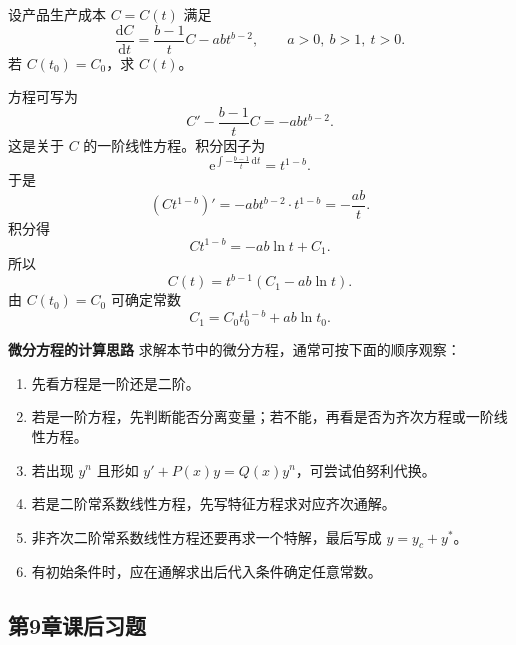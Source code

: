 \documentclass[fontset=fandol]{ctexart}
\newenvironment{custom}[1]{\par\noindent\textbf{#1}\quad}{\par\vspace{0.8em}}
\newcommand{\dd}{\mathrm{d}}
\newcommand{\ee}{\mathrm{e}}
\begin{document}
\begin{example}[成本变化模型]
设产品生产成本 $C=C(t)$ 满足
\[
\frac{\dd C}{\dd t}=\frac{b-1}{t}C-abt^{b-2},
\qquad a>0,\ b>1,\ t>0.
\]
若 $C(t_0)=C_0$，求 $C(t)$。

方程可写为
\[
C'-\frac{b-1}{t}C=-abt^{b-2}.
\]
这是关于 $C$ 的一阶线性方程。积分因子为
\[
\ee^{\int-\frac{b-1}{t}\,\dd t}=t^{1-b}.
\]
于是
\[
(Ct^{1-b})'=-ab t^{b-2}\cdot t^{1-b}=-\frac{ab}{t}.
\]
积分得
\[
Ct^{1-b}=-ab\ln t+C_1.
\]
所以
\[
C(t)=t^{b-1}(C_1-ab\ln t).
\]
由 $C(t_0)=C_0$ 可确定常数
\[
C_1=C_0t_0^{1-b}+ab\ln t_0.
\]
\end{example}

\begin{custom}{微分方程的计算思路}
求解本节中的微分方程，通常可按下面的顺序观察：
\begin{enumerate}
\item 先看方程是一阶还是二阶。
\item 若是一阶方程，先判断能否分离变量；若不能，再看是否为齐次方程或一阶线性方程。
\item 若出现 $y^n$ 且形如 $y'+P(x)y=Q(x)y^n$，可尝试伯努利代换。
\item 若是二阶常系数线性方程，先写特征方程求对应齐次通解。
\item 非齐次二阶常系数线性方程还要再求一个特解，最后写成 $y=y_c+y^*$。
\item 有初始条件时，应在通解求出后代入条件确定任意常数。
\end{enumerate}
\end{custom}

\iffalse


\clearpage
\subsection*{第9章课后习题}
\end{document}
